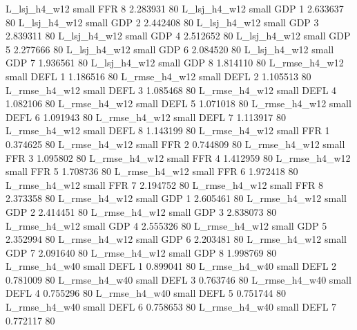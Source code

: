   L_lsj_h4_w12      small      FFR                 8 2.283931 80
  L_lsj_h4_w12      small      GDP                 1 2.633637 80
  L_lsj_h4_w12      small      GDP                 2 2.442408 80
  L_lsj_h4_w12      small      GDP                 3 2.839311 80
  L_lsj_h4_w12      small      GDP                 4 2.512652 80
  L_lsj_h4_w12      small      GDP                 5 2.277666 80
  L_lsj_h4_w12      small      GDP                 6 2.084520 80
  L_lsj_h4_w12      small      GDP                 7 1.936561 80
  L_lsj_h4_w12      small      GDP                 8 1.814110 80
 L_rmse_h4_w12      small     DEFL                 1 1.186516 80
 L_rmse_h4_w12      small     DEFL                 2 1.105513 80
 L_rmse_h4_w12      small     DEFL                 3 1.085468 80
 L_rmse_h4_w12      small     DEFL                 4 1.082106 80
 L_rmse_h4_w12      small     DEFL                 5 1.071018 80
 L_rmse_h4_w12      small     DEFL                 6 1.091943 80
 L_rmse_h4_w12      small     DEFL                 7 1.113917 80
 L_rmse_h4_w12      small     DEFL                 8 1.143199 80
 L_rmse_h4_w12      small      FFR                 1 0.374625 80
 L_rmse_h4_w12      small      FFR                 2 0.744809 80
 L_rmse_h4_w12      small      FFR                 3 1.095802 80
 L_rmse_h4_w12      small      FFR                 4 1.412959 80
 L_rmse_h4_w12      small      FFR                 5 1.708736 80
 L_rmse_h4_w12      small      FFR                 6 1.972418 80
 L_rmse_h4_w12      small      FFR                 7 2.194752 80
 L_rmse_h4_w12      small      FFR                 8 2.373358 80
 L_rmse_h4_w12      small      GDP                 1 2.605461 80
 L_rmse_h4_w12      small      GDP                 2 2.414451 80
 L_rmse_h4_w12      small      GDP                 3 2.838073 80
 L_rmse_h4_w12      small      GDP                 4 2.555326 80
 L_rmse_h4_w12      small      GDP                 5 2.352994 80
 L_rmse_h4_w12      small      GDP                 6 2.203481 80
 L_rmse_h4_w12      small      GDP                 7 2.091640 80
 L_rmse_h4_w12      small      GDP                 8 1.998769 80
 L_rmse_h4_w40      small     DEFL                 1 0.899041 80
 L_rmse_h4_w40      small     DEFL                 2 0.781009 80
 L_rmse_h4_w40      small     DEFL                 3 0.763746 80
 L_rmse_h4_w40      small     DEFL                 4 0.755296 80
 L_rmse_h4_w40      small     DEFL                 5 0.751744 80
 L_rmse_h4_w40      small     DEFL                 6 0.758653 80
 L_rmse_h4_w40      small     DEFL                 7 0.772117 80
